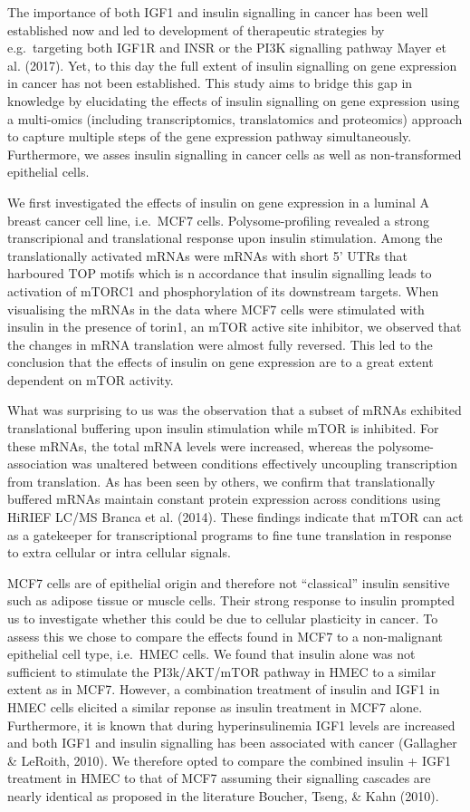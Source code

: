 \documentclass[
  12pt,
  openany]{book}
\begin{document}
The importance of both IGF1 and insulin signalling in cancer has been well established now and led to development of therapeutic strategies by e.g.~targeting both IGF1R and INSR or the PI3K signalling pathway Mayer et al. (2017). Yet, to this day the full extent of insulin signalling on gene expression in cancer has not been established. This study aims to bridge this gap in knowledge by elucidating the effects of insulin signalling on gene expression using a multi-omics (including transcriptomics, translatomics and proteomics) approach to capture multiple steps of the gene expression pathway simultaneously. Furthermore, we asses insulin signalling in cancer cells as well as non-transformed epithelial cells.

We first investigated the effects of insulin on gene expression in a luminal A breast cancer cell line, i.e.~MCF7 cells. Polysome-profiling revealed a strong transcripional and translational response upon insulin stimulation. Among the translationally activated mRNAs were mRNAs with short 5' UTRs that harboured TOP motifs which is n accordance that insulin signalling leads to activation of mTORC1 and phosphorylation of its downstream targets. When visualising the mRNAs in the data where MCF7 cells were stimulated with insulin in the presence of torin1, an mTOR active site inhibitor, we observed that the changes in mRNA translation were almost fully reversed. This led to the conclusion that the effects of insulin on gene expression are to a great extent dependent on mTOR activity.

What was surprising to us was the observation that a subset of mRNAs exhibited translational buffering upon insulin stimulation while mTOR is inhibited. For these mRNAs, the total mRNA levels were increased, whereas the polysome-association was unaltered between conditions effectively uncoupling transcription from translation. As has been seen by others, we confirm that translationally buffered mRNAs maintain constant protein expression across conditions using HiRIEF LC/MS Branca et al. (2014). These findings indicate that mTOR can act as a gatekeeper for transcriptional programs to fine tune translation in response to extra cellular or intra cellular signals.

MCF7 cells are of epithelial origin and therefore not ``classical'' insulin sensitive such as adipose tissue or muscle cells. Their strong response to insulin prompted us to investigate whether this could be due to cellular plasticity in cancer. To assess this we chose to compare the effects found in MCF7 to a non-malignant epithelial cell type, i.e.~HMEC cells. We found that insulin alone was not sufficient to stimulate the PI3k/AKT/mTOR pathway in HMEC to a similar extent as in MCF7. However, a combination treatment of insulin and IGF1 in HMEC cells elicited a similar reponse as insulin treatment in MCF7 alone. Furthermore, it is known that during hyperinsulinemia IGF1 levels are increased and both IGF1 and insulin signalling has been associated with cancer (Gallagher \& LeRoith, 2010). We therefore opted to compare the combined insulin + IGF1 treatment in HMEC to that of MCF7 assuming their signalling cascades are nearly identical as proposed in the literature Boucher, Tseng, \& Kahn (2010).
\end{document}
